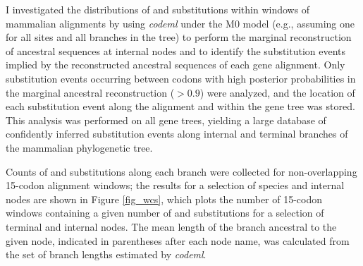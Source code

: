 I investigated the distributions of \nsyn and \syn substitutions
within windows of mammalian alignments by using \emph{codeml}
\citep{Yang2007PAML} under the M0 model (e.g., assuming one \omg for
all sites and all branches in the tree) to perform the marginal
reconstruction of ancestral sequences at internal nodes
\citep{Yang1995} and to identify the substitution events implied by
the reconstructed ancestral sequences of each gene alignment. Only
substitution events occurring between codons with high posterior
probabilities in the marginal ancestral reconstruction ($>0.9$) were
analyzed, and the location of each substitution event along the
alignment and within the gene tree was stored. This analysis was
performed on all gene trees, yielding a large database of confidently
inferred substitution events along internal and terminal branches of
the mammalian phylogenetic tree.

Counts of \syn and \nsyn substitutions along each branch were
collected for non-overlapping 15-codon alignment windows; the results
for a selection of species and internal nodes are shown in Figure
\ref{fig_wcs}, which plots the number of 15-codon windows containing a
given number of \nsyn and \syn substitutions for a selection of
terminal and internal nodes. The mean length of the branch ancestral
to the given node, indicated in parentheses after each node name, was
calculated from the set of branch lengths estimated by \emph{codeml}.

